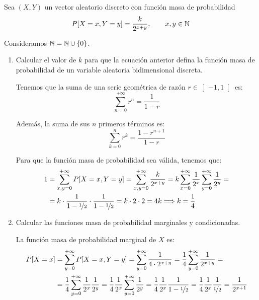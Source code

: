 \begin{ejercicio}
    Sea $(X,Y)$ un vector aleatorio discreto con función masa de probabilidad
    \begin{equation*}
        P[X=x,Y=y] = \dfrac{k}{2^{x+y}},\qquad x,y\in\mathbb{N}
    \end{equation*}
    \begin{observacion}
        Consideramos $\mathbb{N}=\mathbb{N}\cup \{0\}$.
    \end{observacion}
    \begin{enumerate}
        \item Calcular el valor de $k$ para que la ecuación anterior defina la función masa de probabilidad de un variable aleatoria bidimensional discreta.
        
        Tenemos que la suma de una serie geométrica de razón $r\in\left]-1,1\right[$ es:
        \begin{equation*}
            \sum_{n=0}^{+\infty} r^n = \dfrac{1}{1-r}
        \end{equation*}

        Además, la suma de sus $n$ primeros términos es:
        \begin{equation*}
            \sum_{k=0}^{n} r^k = \dfrac{1-r^{n+1}}{1-r}
        \end{equation*}
        
        Para que la función masa de probabilidad sea válida, tenemos que:
        \begin{align*}
            1&=\sum_{x,y=0}^{+\infty} P[X=x,Y=y] = \sum_{x,y=0}^{+\infty} \dfrac{k}{2^{x+y}}
            = k\sum_{x=0}^{+\infty}\dfrac{1}{2^x}\sum_{y=0}^{+\infty}\dfrac{1}{2^y}
            =\\&= k\cdot \dfrac{1}{1-\nicefrac{1}{2}}\cdot \dfrac{1}{1-\nicefrac{1}{2}}
            = k\cdot 2\cdot 2 = 4k
            \Longrightarrow k=\dfrac{1}{4}
        \end{align*}
        \item Calcular las funciones masa de probabilidad marginales y condicionadas.
        
        La función masa de probabilidad marginal de $X$ es:
        \begin{align*}
            P[X=x]&=\sum_{y=0}^{+\infty} P[X=x,Y=y]
            = \sum_{y=0}^{+\infty} \dfrac{1}{4\cdot 2^{x+y}}
            = \dfrac{1}{4}\sum_{y=0}^{+\infty} \dfrac{1}{2^{x+y}}
            =\\&= \dfrac{1}{4}\sum_{y=0}^{+\infty} \dfrac{1}{2^x}\dfrac{1}{2^y}
            = \dfrac{1}{4}\dfrac{1}{2^x}\sum_{y=0}^{+\infty} \dfrac{1}{2^y}
            = \dfrac{1}{4}\dfrac{1}{2^x}\dfrac{1}{1-\nicefrac{1}{2}}
            = \dfrac{1}{4}\dfrac{1}{2^x}\dfrac{1}{\nicefrac{1}{2}}
            = \dfrac{1}{2^{x+1}}
        \end{align*}


\end{enumerate}
\end{ejercicio}
